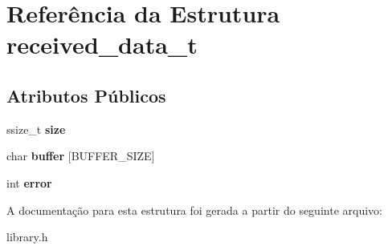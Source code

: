 \hypertarget{structreceived__data__t}{
\section{Referência da Estrutura received\_\-data\_\-t}
\label{structreceived__data__t}
}
\subsection*{Atributos Públicos}
\begin{DoxyCompactItemize}
\item 
\hypertarget{structreceived__data__t_aec539d2d420ac6c43e4835ece424ea0e}{
ssize\_\-t {\bfseries size}}
\label{structreceived__data__t_aec539d2d420ac6c43e4835ece424ea0e}

\item 
\hypertarget{structreceived__data__t_a340a6b5e62115319e86bbfe38d220814}{
char {\bfseries buffer} \mbox{[}BUFFER\_\-SIZE\mbox{]}}
\label{structreceived__data__t_a340a6b5e62115319e86bbfe38d220814}

\item 
\hypertarget{structreceived__data__t_a1feab1b1e298ed9a6a5046250ae3e2de}{
int {\bfseries error}}
\label{structreceived__data__t_a1feab1b1e298ed9a6a5046250ae3e2de}

\end{DoxyCompactItemize}


A documentação para esta estrutura foi gerada a partir do seguinte arquivo:\begin{DoxyCompactItemize}
\item 
library.h\end{DoxyCompactItemize}
